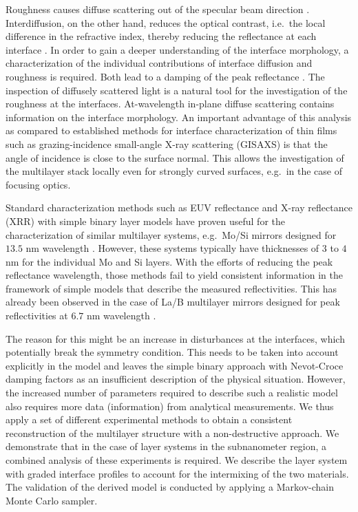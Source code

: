 Roughness causes diffuse scattering out of the specular beam direction 
\cite{sinha_x-ray_1994}. Interdiffusion, on the other hand, 
reduces the optical contrast, i.e.~the local difference in the refractive 
index, thereby reducing the reflectance at each interface 
\cite{nakajima_interdiffusion_1988}. In order to gain a deeper understanding of the 
interface morphology, a characterization of the individual contributions of 
interface diffusion and roughness is required. Both lead to a damping of the 
peak reflectance \cite{croce_p._etude_1976}. The inspection of diffusely scattered 
light is a natural tool for the investigation of the roughness at the 
interfaces. At-wavelength in-plane diffuse scattering contains information on 
the interface morphology. An important advantage of this analysis as compared 
to established methods for interface characterization of thin films such as 
grazing-incidence small-angle X-ray scattering (GISAXS) \cite{levine_grazing-incidence_1989} is 
that the angle of incidence is close to the surface normal. This allows the 
investigation of the multilayer stack locally even for strongly curved 
surfaces, e.g.~in the case of focusing optics.


Standard characterization methods such as EUV reflectance and X-ray reflectance 
(XRR) with simple binary layer models have proven useful for the 
characterization of similar multilayer systems, e.g.~Mo/Si mirrors designed for 
$13.5$ nm wavelength \cite{lim_fabrication_2001, bajt_investigation_2001, braun_mo/si_2002}. However, these systems typically have 
thicknesses of $3$ to $4$ nm for the individual Mo and Si layers. With the 
efforts of reducing the peak reflectance wavelength, those methods fail to 
yield consistent information in the framework of simple models that describe the measured 
reflectivities. This has already been observed in the case of La/B multilayer 
mirrors designed for peak reflectivities at $6.7$ nm wavelength 
\cite{yakunin_combined_2014}.

The reason for this might be an increase in disturbances at the interfaces, 
which potentially break the symmetry condition. This needs to be taken into 
account explicitly in the model and leaves the simple binary approach with 
Nevot-Croce damping factors as an insufficient description of the physical 
situation. However, the increased number of parameters required to describe 
such a realistic model also requires more data (information) from analytical 
measurements. We thus apply a set of different experimental methods to obtain a 
consistent reconstruction of the multilayer structure with a non-destructive 
approach. We demonstrate that in the case of layer systems in the subnanometer 
region, a combined analysis of these experiments is required. We describe the 
layer system with graded interface profiles to account for the intermixing of 
the two materials. The validation of the derived model is conducted by applying 
a Markov-chain Monte Carlo sampler.